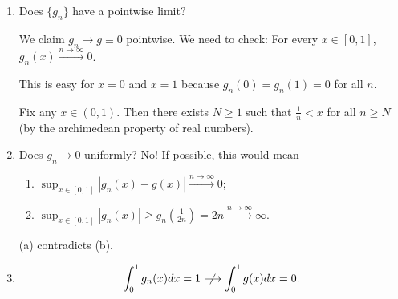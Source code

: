 \documentclass[letterpaper, reqno,11pt]{article}
\begin{document}
\begin{enumerate}
\item Does $\{ g_n \}$ have a pointwise limit?

  We claim $g_n \to g \equiv 0$ pointwise. We need to check: For every $x \in [0, 1]$, $g_n(x) \xrightarrow{n \to \infty} 0$.

  This is easy for $x = 0$ and $x = 1$ because $g_n(0) = g_n(1) = 0$ for all $n$.

  Fix any $x \in (0, 1)$. Then there exists $N \geq 1$ such that $\frac{1}{n} < x$ for all $n \geq N$ (by the archimedean property of real numbers).

  \begin{figure}[H]
    \centering
  \end{figure}

\item Does $g_n \to 0$ uniformly? No! If possible, this would mean
  \begin{enumerate}
  \item $\sup_{x \in [0, 1]} |g_n(x) - g(x)| \xrightarrow{n \to \infty} 0$;
  \item $\sup_{x \in [0, 1]} |g_n(x)| \geq g_n(\frac{1}{2n}) = 2n \xrightarrow{n \to \infty} \infty$.
  \end{enumerate}
  (a) contradicts (b).

\item
  $$ \int_0^1 g_n(x)dx = 1 \centernot \longrightarrow \int_0^1 g(x)dx = 0. $$
\end{enumerate}
\end{document}
